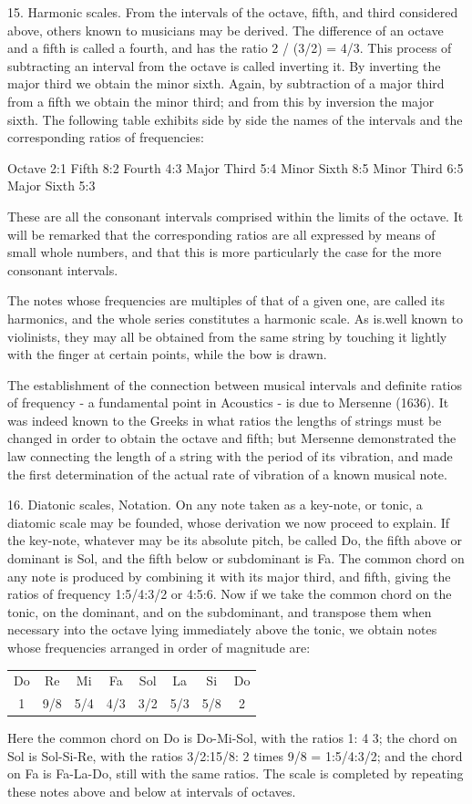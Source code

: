 15.  Harmonic scales.  From the intervals of the octave, fifth, and third
considered above, others known to musicians may be derived. The difference of
an octave and a fifth is called a fourth, and has the ratio 2 / (3/2) = 4/3.
This process of subtracting an interval from the octave is called inverting it.
By inverting the major third we obtain the minor sixth. Again, by subtraction
of a major third from a fifth we obtain the minor third; and from this by
inversion the major sixth. The following table exhibits side by side the names
of the intervals and the corresponding ratios of frequencies:

Octave 2:1 Fifth 8:2 Fourth 4:3 Major Third 5:4 Minor Sixth 8:5 Minor Third 6:5
Major Sixth 5:3

These are all the consonant intervals comprised within the limits of the
octave. It will be remarked that the corresponding ratios are all expressed by
means of small whole numbers, and that this is more particularly the case for
the more consonant intervals.

The notes whose frequencies are multiples of that of a given one, are called
its harmonics, and the whole series constitutes a harmonic scale.  As is.well
known to violinists, they may all be obtained from the same string by touching
it lightly with the finger at certain points, while the bow is drawn.

The establishment of the connection between musical intervals and definite
ratios of frequency - a fundamental point in Acoustics - is due to Mersenne
(1636). It was indeed known to the Greeks in what ratios the lengths of strings
must be changed in order to obtain the octave and fifth; but Mersenne
demonstrated the law connecting the length of a string with the period of its
vibration, and made the first determination of the actual rate of vibration of
a known musical note.

16.  Diatonic scales, Notation.  On any note taken as a key-note, or tonic, a
diatomic scale may be founded, whose derivation we now proceed to explain. If
the key-note, whatever may be its absolute pitch, be called Do, the fifth above
or dominant is Sol, and the fifth below or subdominant is Fa. The common chord
on any note is produced by combining it with its major third, and fifth, giving
the ratios of frequency 1:5/4:3/2 or 4:5:6. Now if we take the common chord on
the tonic, on the dominant, and on the subdominant, and transpose them when
necessary into the octave lying immediately above the tonic, we obtain notes
whose frequencies arranged in order of magnitude are:
\begin{tabular}{cccccccc}
Do&Re&Mi&Fa&Sol&La&Si&Do \\ 1&9/8&5/4&4/3&3/2&5/3&5/8&2
\end{tabular}
Here the common chord on Do is Do-Mi-Sol, with the ratios 1: 4 3; the chord on
Sol is Sol-Si-Re, with the ratios 3/2:15/8: 2 times 9/8 = 1:5/4:3/2; and the
chord on Fa is Fa-La-Do, still with the same ratios.  The scale is completed by
repeating these notes above and below at intervals of octaves.

